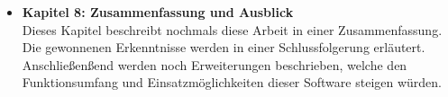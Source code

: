 \begin{itemize}
\item  \textbf{Kapitel 8: Zusammenfassung und Ausblick}\\
Dieses Kapitel beschreibt nochmals diese Arbeit in einer Zusammenfassung. Die gewonnenen Erkenntnisse werden in einer Schlussfolgerung erl\"autert. Anschließen{\ss}end werden noch Erweiterungen beschrieben, welche den Funktionsumfang und Einsatzm\"oglichkeiten dieser Software steigen w\"urden.

\end{itemize}

